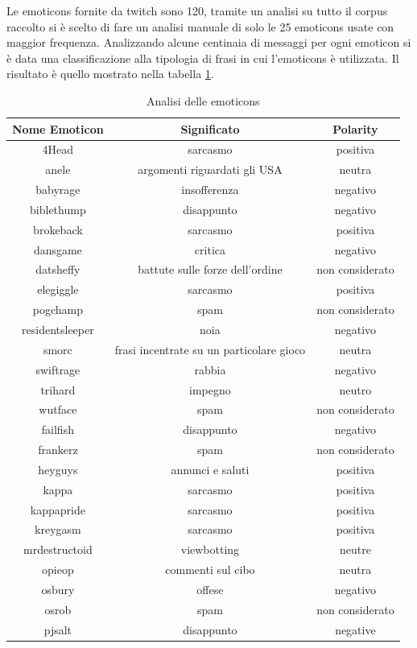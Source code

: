 \documentclass[a4paper,12pt,openright,twoside]{report}
\theoremstyle{definition}
\begin{document}
Le emoticons fornite da twitch sono 120, tramite un analisi su tutto il corpus raccolto si è scelto di fare un analisi
manuale di solo le 25 emoticons usate con maggior frequenza. Analizzando alcune centinaia di messaggi 
per ogni emoticon
si è data una classificazione alla tipologia di frasi in cui l'emoticons è utilizzata. Il risultato è
quello mostrato nella tabella \ref{tab:emoticons1}.

\begin{table}[H]
\begin{center}
\begin{tabular}{|c|c|c|}
\hline
Nome Emoticon & Significato & Polarity \\
\hline
\hline
4Head & sarcasmo & positiva \\
\hline
anele & argomenti riguardati gli USA & neutra \\
\hline
babyrage & insofferenza & negativo \\
\hline
biblethump & disappunto & negativo \\
\hline
brokeback & sarcasmo & positiva \\
\hline
dansgame & critica & negativo \\
\hline
datsheffy & battute sulle forze dell'ordine & non considerato \\
\hline
elegiggle & sarcasmo & positiva \\
\hline
pogchamp & spam & non considerato \\
\hline
residentsleeper & noia & negativo \\
\hline
smorc & frasi incentrate su un particolare gioco & neutra \\
\hline
swiftrage & rabbia & negativo \\
\hline
trihard & impegno &  neutro \\
\hline
wutface & spam & non considerato \\
\hline
failfish & disappunto & negativo \\
\hline
frankerz & spam & non considerato \\
\hline
heyguys & annunci e saluti & positiva \\
\hline
kappa & sarcasmo & positiva \\
\hline
kappapride & sarcasmo & positiva \\
\hline
kreygasm & sarcasmo & positiva \\
\hline
mrdestructoid & viewbotting & neutre \\
\hline
opieop & commenti sul cibo & neutra \\
\hline
osbury & offese & negativo \\
\hline
osrob & spam & non considerato \\
\hline
pjsalt & disappunto & negative \\
\hline
\end{tabular}
\end{center}
\caption{Analisi delle emoticons}
\label{tab:emoticons1}
\end{table}
\end{document}
